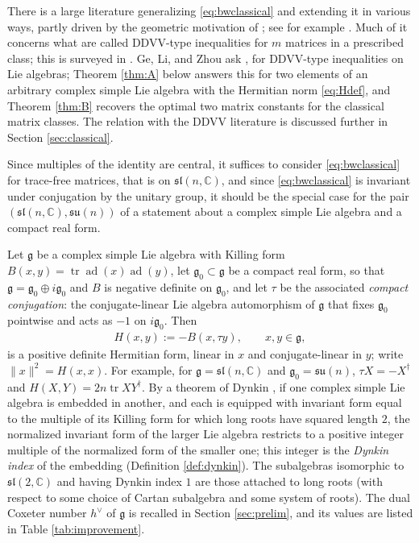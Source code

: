 \documentclass[leqno,10pt]{amsart}
\theoremstyle{definition}
\numberwithin{equation}{section}
\newcommand{\su}{\mathfrak{su}}
\newcommand{\sll}{\mathfrak{sl}}
\newcommand{\g}{\mathfrak{g}}
\newcommand{\ad}{\operatorname{ad}}
\newcommand{\com}{\mathbb C}
\newcommand{\tr}{\operatorname{tr}}
\newcommand{\gz}{\g_{0}}
\newcommand{\hv}{h^\vee}
\newcommand{\norm}[1]{\lVert #1\rVert}
\begin{document}
There is a large literature generalizing \eqref{eq:bwclassical} and extending it in various ways, partly driven by the geometric motivation of \cite{Chern-Docarmo-Kobayashi}; see for example \cite{Cheng-Vong-Wenzel, Ge, Ge-Li-Zhou, Lu-remarks, Lu-Wenzel, Wu-Liu}. Much of it concerns what are called DDVV-type inequalities for $m$ matrices in a prescribed class; this is surveyed in \cite{Ge-Li-Tang-Zhou-survey}. Ge, Li, and Zhou ask \cite[Section 1, question (2)]{Ge-Li-Zhou}, \cite[Question 4.2]{Ge-Li-Tang-Zhou-survey} for DDVV-type inequalities on Lie algebras; Theorem \ref{thm:A} below answers this for two elements of an arbitrary complex simple Lie algebra with the Hermitian norm \eqref{eq:Hdef}, and Theorem \ref{thm:B} recovers the optimal two matrix constants for the classical matrix classes. The relation with the DDVV literature is discussed further in Section \ref{sec:classical}.

Since multiples of the identity are central, it suffices to consider \eqref{eq:bwclassical} for trace-free matrices, that is on $\sll(n, \com)$, and since \eqref{eq:bwclassical} is invariant under conjugation by the unitary group, it should be the special case for the pair $(\sll(n, \com), \su(n))$ of a statement about a complex simple Lie algebra and a compact real form.

Let $\g$ be a complex simple Lie algebra with Killing form $B(x, y) = \tr\ad(x)\ad(y)$, let $\gz \subset \g$ be a compact real form, so that $\g = \gz \oplus i\gz$ and $B$ is negative definite on $\gz$, and let $\tau$ be the associated \emph{compact conjugation}: the conjugate-linear Lie algebra automorphism of $\g$ that fixes $\gz$ pointwise and acts as $-1$ on $i\gz$. Then
\begin{align}\label{eq:Hdef}
H(x,y) := -B(x,\tau y), \qquad x,y\in\g,
\end{align}
is a positive definite Hermitian form, linear in $x$ and conjugate-linear in $y$; write $\norm{x}^{2} = H(x, x)$. For example, for $\g = \sll(n, \com)$ and $\gz = \su(n)$, $\tau X = -X^{\dagger}$ and $H(X, Y) = 2n\tr XY^{\dagger}$. By a theorem of Dynkin \cite[Theorem~2.2]{Dynkin-semisimplesubalgebras}, if one complex simple Lie algebra is embedded in another, and each is equipped with invariant form equal to the multiple of its Killing form for which long roots have squared length $2$, the normalized invariant form of the larger Lie algebra restricts to a positive integer multiple of the normalized form of the smaller one; this integer is the \emph{Dynkin index} of the embedding (Definition \ref{def:dynkin}). The subalgebras isomorphic to $\sll(2, \com)$ and having Dynkin index $1$ are those attached to long roots (with respect to some choice of Cartan subalgebra and some system of roots). The dual Coxeter number $\hv$ of $\g$ is recalled in Section \ref{sec:prelim}, and its values are listed in Table \ref{tab:improvement}.
\end{document}

